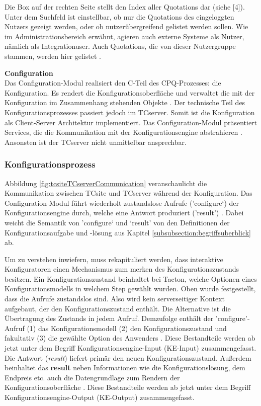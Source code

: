 \documentclass[12pt,a4paper,bibliography=totocnumbered,listof=totoc]{scrartcl}
\begin{document}
Die Box auf der rechten Seite stellt den Index aller Quotations dar (siehe [4]). Unter dem Suchfeld ist einstellbar, ob nur die Quotations des eingeloggten Nutzers gezeigt werden, oder ob nutzerübergreifend gelistet werden sollen. Wie im Administrationsbereich erwähnt, agieren auch externe Systeme als Nutzer, nämlich als Integrationuser. Auch Quotations, die von dieser Nutzergruppe stammen, werden hier gelistet \citep{tactonTCsiteReferenceManual}.

\textbf{Configuration}\\
Das Configuration-Modul realisiert den C-Teil des CPQ-Prozesses: die Konfiguration. Es rendert die Konfigurationsoberfläche und verwaltet die mit der Konfiguration im Zusammenhang stehenden Objekte \citep{tactonTCsiteDevelopmentManual}. Der technische Teil des Konfigurationsprozesses passiert jedoch im TCserver. Somit ist die Konfiguration als Client-Server Architektur implementiert. Das Configuration-Modul präsentiert Services, die die Kommunikation mit der Konfigurationsengine abstrahieren \citep{tactonTCsiteApiDocu}. Ansonsten ist der TCserver nicht unmittelbar ansprechbar.

\subsubsection{Konfigurationsprozess}
\label{subsubsection:tcsiteKonfigurationsprozess}

Abbildung \ref{fig:tcsiteTCserverCommunication} veranschaulicht die Kommunikation zwischen TCsite und TCserver während der Konfiguration. Das Configuration-Modul führt wiederholt zustandslose Aufrufe ('configure‘) der Konfigurationsengine durch, welche eine Antwort produziert ('result') \citep{tactonTCsiteDevelopmentManual}. Dabei weicht die Semantik von 'configure‘ und ‘result' von den Definitionen der Konfigurationsaufgabe und -lösung aus Kapitel \ref{subsubsection:begriffsuberblick} ab.

Um zu verstehen inwiefern, muss rekapituliert werden, dass interaktive Konfiguratoren einen Mechanismus zum merken des Konfigurationszustands besitzen. Ein Konfigurationszustand beinhaltet bei Tacton, welche Optionen eines Konfigurationsmodells in welchem Step gewählt wurden. Oben wurde festgestellt, dass die Aufrufe zustandslos sind. Also wird kein serverseitiger Kontext aufgebaut, der den Konfigurationszustand enthält. Die Alternative ist die Übertragung des Zustands in jedem Aufruf. Demzufolge enthält der 'configure'-Aufruf (1) das Konfigurationsmodell (2) den Konfigurationszustand und fakultativ (3) die gewählte Option des Anwenders \citep{tactonTCsiteApiDocu}. Diese Bestandteile werden ab jetzt unter dem Begriff Konfigurationsengine-Input (KE-Input) zusammengefasst. Die Antwort (\emph{result}) liefert primär den neuen Konfigurationszustand. Außerdem beinhaltet das \textbf{result} neben Informationen wie die Konfigurationslösung, dem Endpreis etc. auch die Datengrundlage zum Rendern der Konfigurationsoberfläche \citep{tactonTCsiteApiDocu}. Diese Bestandteile werden ab jetzt unter dem Begriff Konfigurationsengine-Output (KE-Output) zusammengefasst.
\end{document}
